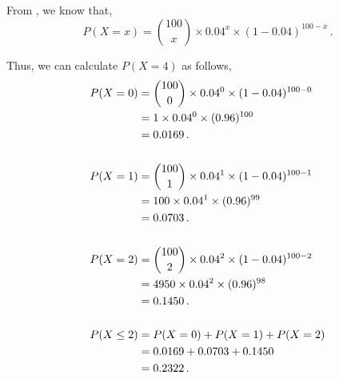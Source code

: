\begin{subquestions}
\begin{subsubquestions}
From , we know that,
\begin{equation}
	P(X = x) = { 100 \choose x} \times 0.04^x \times (1-0.04)^{100-x} \,.
\end{equation}

Thus, we can calculate $P(X=4)$ as follows,
\begin{align}
	P(X = 0) & = { 100 \choose 0} \times 0.04^0 \times (1-0.04)^{100-0} \nonumber \\
             & = 1 \times 0.04^0 \times (0.96)^{100} \nonumber \\
	         & = 0.0169 \,. \\ \nonumber \\
	P(X = 1) & = { 100 \choose 1} \times 0.04^1 \times (1-0.04)^{100-1} \nonumber \\
			 & = 100 \times 0.04^1 \times (0.96)^{99} \nonumber \\
			 & = 0.0703 \,. \\ \nonumber \\	 
	P(X = 2) & = { 100 \choose 2} \times 0.04^2 \times (1-0.04)^{100-2} \nonumber \\
			 & = 4950 \times 0.04^2 \times (0.96)^{98} \nonumber \\
			 & = 0.1450 \,. \\ \nonumber \\
	P(X \leq 2) & = P(X=0)+P(X=1)+P(X=2) \nonumber \\
	            & = 0.0169+0.0703+0.1450 \nonumber \\
	            & = 0.2322 \,.		 
\end{align}

\end{subsubquestions}

\end{subquestions}